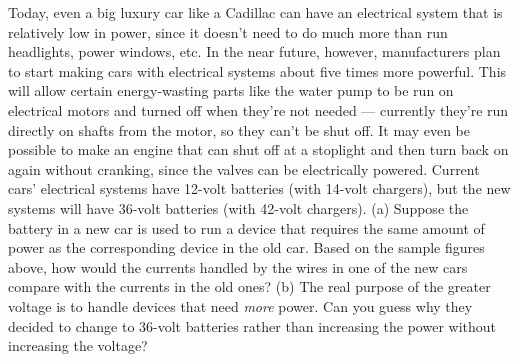         Today, even a big luxury car like a Cadillac can have an
        electrical system that is relatively low in power, since it
        doesn't need to do much more than run headlights, power
        windows, etc. In the near future, however, manufacturers
        plan to start making cars with electrical systems about five
        times more powerful. This will allow certain energy-wasting
        parts like the water pump to be run on  electrical motors
        and turned off when they're not needed --- currently they're
        run directly on shafts from the motor, so they can't be shut
        off. It may even be possible to make an engine that can shut
        off at a stoplight and then turn back on again without
        cranking, since the valves can be electrically powered.
        Current cars' electrical systems have 12-volt batteries
        (with 14-volt chargers), but the new systems will have
        36-volt batteries (with 42-volt chargers). \hwendpart
        (a) Suppose the
        battery in a new car is used to run a device that requires
        the same amount of power as the corresponding device in the
        old car. Based on the sample figures above, how would the
        currents handled by the wires in one of the new cars compare
        with the currents in the old ones?\hwendpart
         (b) The real purpose of
        the greater voltage is to handle devices that need
        \emph{more} power. Can you guess why they decided to change
        to 36-volt batteries rather than increasing the power
        without increasing the voltage?
        \answercheck
